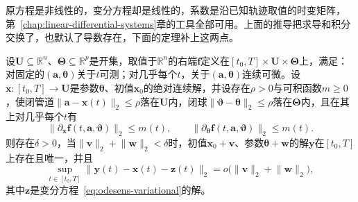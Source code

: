 原方程是非线性的，变分方程却是线性的，系数是沿已知轨迹取值的时变矩阵，第~\ref{chap:linear-differential-systems}章的工具全部可用。上面的推导把求导和积分交换了，也默认了导数存在，下面的定理补上这两点。

\begin{theorem}[解的可微依赖]
\label{thm:odesens-differentiable}
设$\bm{U}\subseteq\mathbb{R}^{n}$、$\bm{\Theta}\subseteq\mathbb{R}^{p}$是开集，取值于$\mathbb{R}^{n}$的右端$\bm{f}$定义在$[t_0,T]\times\bm{U}\times\bm{\Theta}$上，满足：对固定的$(\bm{a},\bm{\theta})$关于$t$可测；对几乎每个$t$，关于$(\bm{a},\bm{\theta})$连续可微。设$\bm{x}:[t_0,T]\to\bm{U}$是参数$\bm{\theta}$、初值$\bm{x}_0$的绝对连续解，并设存在$\rho>0$与可积函数$m\geq0$，使闭管道$\lVert\bm{a}-\bm{x}(t)\rVert_2\leq\rho$落在$\bm{U}$内，闭球$\lVert\bm{\vartheta}-\bm{\theta}\rVert_2\leq\rho$落在$\bm{\Theta}$内，且在其上对几乎每个$t$有
\begin{equation}
 \lVert\partial_{\bm{x}}\bm{f}(t,\bm{a},\bm{\vartheta})\rVert_2\leq m(t),\qquad
 \lVert\partial_{\bm{\theta}}\bm{f}(t,\bm{a},\bm{\vartheta})\rVert_2\leq m(t).
 \label{eq:odesens-derivative-bound}
\end{equation}
则存在$\delta>0$，当$\lVert\bm{v}\rVert_2+\lVert\bm{w}\rVert_2<\delta$时，初值$\bm{x}_0+\bm{v}$、参数$\bm{\theta}+\bm{w}$的解$\bm{y}$在$[t_0,T]$上存在且唯一，并且
\begin{equation}
 \sup_{t\in[t_0,T]}\bigl\lVert\bm{y}(t)-\bm{x}(t)-\bm{z}(t)\bigr\rVert_2=o\bigl(\lVert\bm{v}\rVert_2+\lVert\bm{w}\rVert_2\bigr),
 \label{eq:odesens-differentiable}
\end{equation}
其中$\bm{z}$是变分方程~\eqref{eq:odesens-variational}的解。
\end{theorem}

